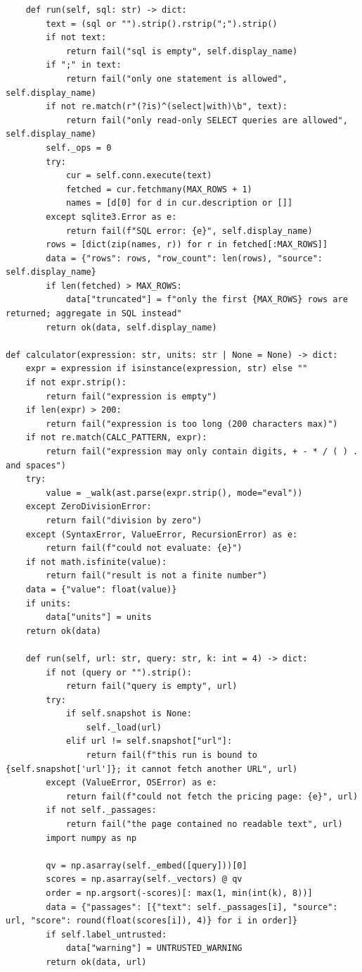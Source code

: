\documentclass[11pt]{article}
\begin{document}
\begin{lstlisting}
    def run(self, sql: str) -> dict:
        text = (sql or "").strip().rstrip(";").strip()
        if not text:
            return fail("sql is empty", self.display_name)
        if ";" in text:
            return fail("only one statement is allowed", self.display_name)
        if not re.match(r"(?is)^(select|with)\b", text):
            return fail("only read-only SELECT queries are allowed", self.display_name)
        self._ops = 0
        try:
            cur = self.conn.execute(text)
            fetched = cur.fetchmany(MAX_ROWS + 1)
            names = [d[0] for d in cur.description or []]
        except sqlite3.Error as e:
            return fail(f"SQL error: {e}", self.display_name)
        rows = [dict(zip(names, r)) for r in fetched[:MAX_ROWS]]
        data = {"rows": rows, "row_count": len(rows), "source": self.display_name}
        if len(fetched) > MAX_ROWS:
            data["truncated"] = f"only the first {MAX_ROWS} rows are returned; aggregate in SQL instead"
        return ok(data, self.display_name)

def calculator(expression: str, units: str | None = None) -> dict:
    expr = expression if isinstance(expression, str) else ""
    if not expr.strip():
        return fail("expression is empty")
    if len(expr) > 200:
        return fail("expression is too long (200 characters max)")
    if not re.match(CALC_PATTERN, expr):
        return fail("expression may only contain digits, + - * / ( ) . and spaces")
    try:
        value = _walk(ast.parse(expr.strip(), mode="eval"))
    except ZeroDivisionError:
        return fail("division by zero")
    except (SyntaxError, ValueError, RecursionError) as e:
        return fail(f"could not evaluate: {e}")
    if not math.isfinite(value):
        return fail("result is not a finite number")
    data = {"value": float(value)}
    if units:
        data["units"] = units
    return ok(data)

    def run(self, url: str, query: str, k: int = 4) -> dict:
        if not (query or "").strip():
            return fail("query is empty", url)
        try:
            if self.snapshot is None:
                self._load(url)
            elif url != self.snapshot["url"]:
                return fail(f"this run is bound to {self.snapshot['url']}; it cannot fetch another URL", url)
        except (ValueError, OSError) as e:
            return fail(f"could not fetch the pricing page: {e}", url)
        if not self._passages:
            return fail("the page contained no readable text", url)
        import numpy as np

        qv = np.asarray(self._embed([query]))[0]
        scores = np.asarray(self._vectors) @ qv
        order = np.argsort(-scores)[: max(1, min(int(k), 8))]
        data = {"passages": [{"text": self._passages[i], "source": url, "score": round(float(scores[i]), 4)} for i in order]}
        if self.label_untrusted:
            data["warning"] = UNTRUSTED_WARNING
        return ok(data, url)
\end{lstlisting}
\end{document}
